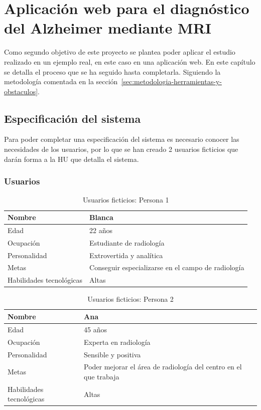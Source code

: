 \chapter{Aplicación web para el diagnóstico del Alzheimer mediante MRI}
\label{ch:aplicacion-web-para-el-diagnostico-del-alzheimer-mediante-mri}
Como segundo objetivo de este proyecto se plantea poder aplicar el estudio realizado en un ejemplo real, en este caso
en una aplicación web.
En este capítulo se detalla el proceso que se ha seguido hasta completarla.
Siguiendo la metodología comentada en la sección~\ref{sec:metodologia-herramientas-y-obstaculos}.

\section{Especificación del sistema}\label{sec:especificacion-del-sistema}
Para poder completar una especificación del sistema es necesario conocer las necesidades de los usuarios, por lo que se
han creado 2 usuarios ficticios que darán forma a la HU que detalla el sistema.

\subsection{Usuarios}\label{subsec:usuarios}
\begin{table}[H]
    \centering
    \begin{tabular}{| l | l|}
        \hline
        Nombre & Blanca \\
        \hline
        Edad & 22 años \\
        \hline
        Ocupación & Estudiante de radiología \\
        \hline
        Personalidad & Extrovertida y analítica \\
        \hline
        Metas & Conseguir especializarse en el campo de radiología \\
        \hline
        Habilidades tecnológicas & Altas \\
        \hline
    \end{tabular}
    \caption{Usuarios ficticios: Persona 1}
    \label{tab:persona1}
\end{table}

\begin{table}[H]
    \centering
    \begin{tabular}{| l | l|}
        \hline
        Nombre & Ana \\
        \hline
        Edad & 45 años \\
        \hline
        Ocupación & Experta en radiología \\
        \hline
        Personalidad & Sensible y positiva \\
        \hline
        Metas & Poder mejorar el área de radiología del centro en el que trabaja \\
        \hline
        Habilidades tecnológicas & Altas \\
        \hline
    \end{tabular}
    \caption{Usuarios ficticios: Persona 2}
    \label{tab:persona2}
\end{table}


